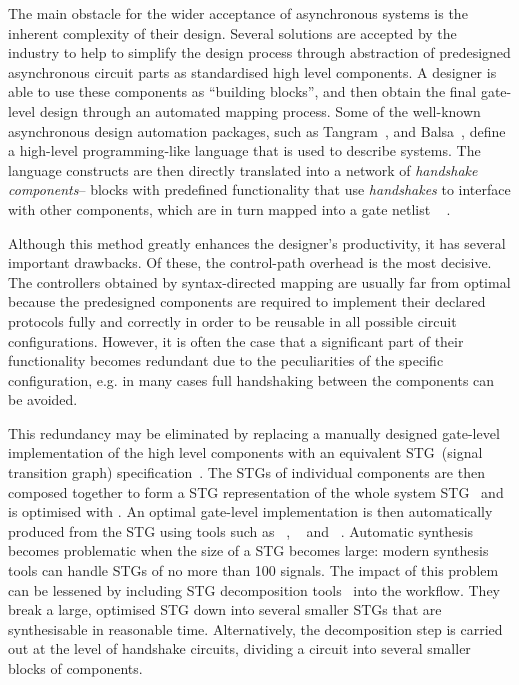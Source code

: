 The main obstacle for the wider acceptance of asynchronous systems is the inherent complexity of their design. Several solutions are
accepted by the industry to help to simplify the design process through abstraction
of predesigned asynchronous circuit parts as standardised high level
components. A designer is able to use these components as ``building
blocks'', and then obtain the final gate-level design through an
automated mapping process. Some of the well-known asynchronous
design automation packages, such as Tangram~\cite{951597}, and Balsa~\cite{balsa},
define a high-level programming-like language that is used to describe
systems. The language constructs are then directly translated into
a network of \emph{handshake components}-- blocks with predefined
functionality that use \emph{handshakes} to interface with other components,
which are in turn mapped into a gate netlist ~ \cite{XXXX}. 

Although this method greatly enhances the designer's productivity,
it has several important drawbacks. Of these, the control-path overhead
is the most decisive. The controllers obtained by syntax-directed
mapping are usually far from optimal because the predesigned components
are required to implement their declared protocols fully and correctly
in order to be reusable in all possible circuit configurations. However,
it is often the case that a significant part of their functionality
becomes redundant due to the peculiarities of the specific configuration,
e.g. in many cases full handshaking between the components can be
avoided.

This redundancy may be eliminated by replacing a manually designed
gate-level implementation of the high level components with an equivalent
STG~(signal transition graph) specification~\cite{Yakovlev_1998_cs}.
The STGs of individual components are then composed together to form a
 STG representation of the whole system STG~\cite{785214} and is optimised with \cite{cortadella_petrify}.
An optimal gate-level implementation is then automatically produced
from the STG using tools such as ~\cite{cortadella_petrify},
~\cite{Sentovich:M92/41} and ~\cite{Khomenko_2004_MPSAT}.
Automatic synthesis becomes problematic when the size of a STG becomes
large: modern synthesis tools can handle STGs of no more than 100
signals. The impact of this problem can be lessened by including STG decomposition tools~\cite{DesiJ} into the workflow. They break a large, optimised STG down into several smaller STGs that are synthesisable
in reasonable time. Alternatively, the decomposition step is carried
out at the level of handshake circuits, dividing a circuit into several
smaller blocks of components.





